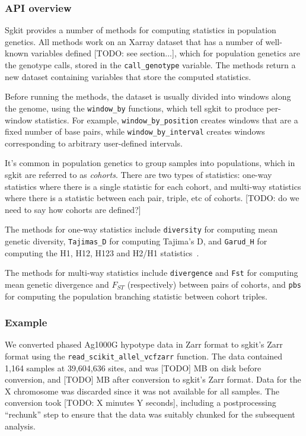 \documentclass[a4paper,num-refs]{oup-contemporary}
\newcommand{\sgapi}[1]{\texttt{#1}}
\begin{document}
\subsubsection{API overview}

Sgkit provides a number of methods for computing statistics in population
genetics. All methods work on an Xarray dataset that has a number of well-known
variables defined [TODO: see section...], which for population genetics are the
genotype calls, stored in the \sgapi{call\_genotype} variable. The methods return a
new dataset containing variables that store the computed statistics.

Before running the methods, the dataset is usually divided into windows along
the genome, using the \sgapi{window\_by} functions, which tell sgkit to produce
per-window statistics. For example, \sgapi{window\_by\_position} creates windows that
are a fixed number of base pairs, while \sgapi{window\_by\_interval} creates windows
corresponding to arbitrary user-defined intervals.

It's common in population genetics to group samples into populations, which in
sgkit are referred to as \emph{cohorts}. There are two types of statistics: one-way
statistics where there is a single statistic for each cohort, and multi-way
statistics where there is a statistic between each pair, triple, etc of
cohorts. [TODO: do we need to say how cohorts are defined?]

The methods for one-way statistics include \sgapi{diversity} for computing mean
genetic diversity, \sgapi{Tajimas\_D} for computing Tajima’s D, and
\sgapi{Garud\_H} for
computing the H1, H12, H123 and H2/H1 statistics~\citep{garud2015recent}.

The methods for multi-way statistics include \sgapi{divergence} and
\sgapi{Fst} for
computing mean genetic divergence and $F_{ST}$ (respectively) between pairs of
cohorts, and \sgapi{pbs} for computing the population branching statistic between
cohort triples.

\subsubsection{Example}

We converted phased Ag1000G hypotype data in Zarr format
to sgkit's Zarr format
using the \sgapi{read\_scikit\_allel\_vcfzarr} function.
The data contained 1,164
samples at 39,604,636 sites, and was [TODO] MB on disk before conversion, and
[TODO] MB after conversion to sgkit's Zarr format. Data for the X chromosome
was discarded since it was not available for all samples. The conversion took
[TODO: X minutes Y seconds], including a postprocessing ``rechunk'' step to
ensure that the data was suitably chunked for the subsequent analysis.
\end{document}
